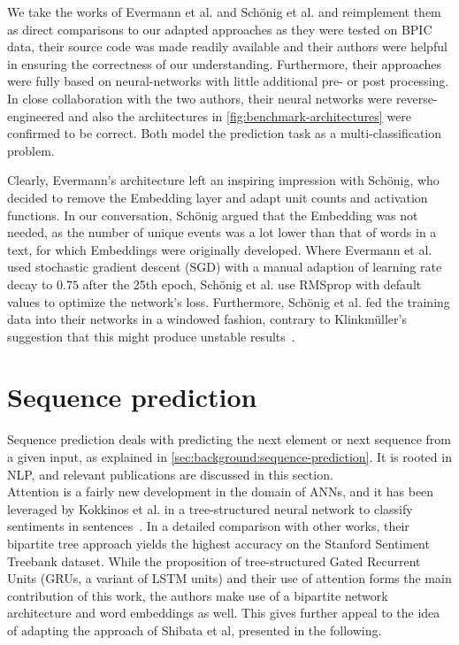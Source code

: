 We take the works of Evermann et al. and Schönig et al. and reimplement them as direct comparisons to our adapted approaches as they were tested on BPIC data, their source code was made readily available and their authors were helpful in ensuring the correctness of our understanding. Furthermore, their approaches were fully based on neural-networks with little additional pre- or post processing. In close collaboration with the two authors, their neural networks were reverse-engineered and also the architectures in \autoref{fig:benchmark-architectures} were confirmed to be correct. Both model the prediction task as a multi-classification problem.

Clearly, Evermann's architecture left an inspiring impression with Schönig, who decided to remove the Embedding layer and adapt unit counts and activation functions. In our conversation, Schönig argued that the Embedding was not needed, as the number of unique events was a lot lower than that of words in a text, for which Embeddings were originally developed. Where Evermann et al. used stochastic gradient descent (SGD) with a manual adaption of learning rate decay to $0.75$ after the 25th epoch, Schönig et al. use RMSprop with default values to optimize the network's loss. Furthermore, Schönig et al. fed the training data into their networks in a windowed fashion, contrary to Klinkmüller's suggestion that this might produce unstable results~\cite{klinkmuller2018reliablemonitoring}.

\section{Sequence prediction}\label{sec:related-work-sequence-prediction}
Sequence prediction deals with predicting the next element or next sequence from a given input, as explained in \autoref{sec:background:sequence-prediction}. It is rooted in NLP, and relevant publications are discussed in this section.\\

Attention is a fairly new development in the domain of ANNs, and it has been leveraged by Kokkinos et al. in a tree-structured neural network to classify sentiments in sentences~\cite{kokkinos2017structural}. In a detailed comparison with other works, their bipartite tree approach yields the highest accuracy on the Stanford Sentiment Treebank dataset. While the proposition of tree-structured Gated Recurrent Units (GRUs, a variant of LSTM units) and their use of attention forms the main contribution of this work, the authors make use of a bipartite network architecture and word embeddings as well. This gives further appeal to the idea of adapting the approach of Shibata et al, presented in the following.\\

